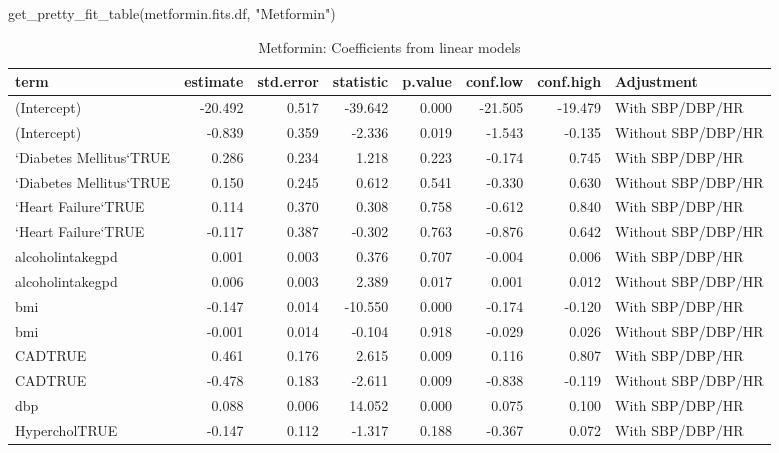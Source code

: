 \documentclass[
]{article}
\newenvironment{Shaded}{\begin{snugshade}}{\end{snugshade}}
\newcommand{\FunctionTok}[1]{\textcolor[rgb]{0.00,0.00,0.00}{#1}}
\newcommand{\NormalTok}[1]{#1}
\newcommand{\StringTok}[1]{\textcolor[rgb]{0.31,0.60,0.02}{#1}}
\begin{document}
\begin{Shaded}
\begin{Highlighting}[]
\FunctionTok{get\_pretty\_fit\_table}\NormalTok{(metformin.fits.df, }\StringTok{"Metformin"}\NormalTok{)}
\end{Highlighting}
\end{Shaded}

\begin{table}

\caption{\label{tab:metformin-fit-table}Metformin: Coefficients from linear models}
\centering
\begin{tabular}[t]{l|r|r|r|r|r|r|l}
\hline
term & estimate & std.error & statistic & p.value & conf.low & conf.high & Adjustment\\
\hline
(Intercept) & -20.492 & 0.517 & -39.642 & 0.000 & -21.505 & -19.479 & With SBP/DBP/HR\\
\hline
(Intercept) & -0.839 & 0.359 & -2.336 & 0.019 & -1.543 & -0.135 & Without SBP/DBP/HR\\
\hline
`Diabetes Mellitus`TRUE & 0.286 & 0.234 & 1.218 & 0.223 & -0.174 & 0.745 & With SBP/DBP/HR\\
\hline
`Diabetes Mellitus`TRUE & 0.150 & 0.245 & 0.612 & 0.541 & -0.330 & 0.630 & Without SBP/DBP/HR\\
\hline
`Heart Failure`TRUE & 0.114 & 0.370 & 0.308 & 0.758 & -0.612 & 0.840 & With SBP/DBP/HR\\
\hline
`Heart Failure`TRUE & -0.117 & 0.387 & -0.302 & 0.763 & -0.876 & 0.642 & Without SBP/DBP/HR\\
\hline
alcoholintakegpd & 0.001 & 0.003 & 0.376 & 0.707 & -0.004 & 0.006 & With SBP/DBP/HR\\
\hline
alcoholintakegpd & 0.006 & 0.003 & 2.389 & 0.017 & 0.001 & 0.012 & Without SBP/DBP/HR\\
\hline
bmi & -0.147 & 0.014 & -10.550 & 0.000 & -0.174 & -0.120 & With SBP/DBP/HR\\
\hline
bmi & -0.001 & 0.014 & -0.104 & 0.918 & -0.029 & 0.026 & Without SBP/DBP/HR\\
\hline
CADTRUE & 0.461 & 0.176 & 2.615 & 0.009 & 0.116 & 0.807 & With SBP/DBP/HR\\
\hline
CADTRUE & -0.478 & 0.183 & -2.611 & 0.009 & -0.838 & -0.119 & Without SBP/DBP/HR\\
\hline
dbp & 0.088 & 0.006 & 14.052 & 0.000 & 0.075 & 0.100 & With SBP/DBP/HR\\
\hline
HypercholTRUE & -0.147 & 0.112 & -1.317 & 0.188 & -0.367 & 0.072 & With SBP/DBP/HR\\

\end{tabular}
\end{table}
\end{document}
